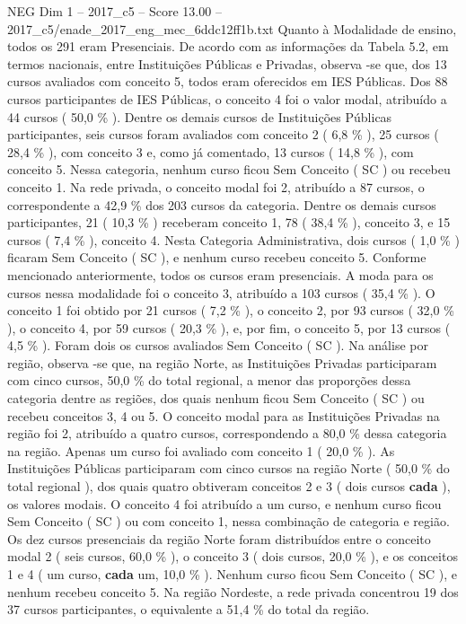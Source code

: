 \begin{textsample}{NEG Dim 1 – 2017\_c5 – Score 13.00 – 2017\_c5/enade\_2017\_eng\_mec\_6ddc12ff1b.txt}
Quanto à Modalidade de ensino, todos os 291 eram Presenciais.
De acordo com as informações da Tabela 5.2, em termos nacionais, entre Instituições Públicas e Privadas, observa -se que, dos 13 cursos avaliados com conceito 5, todos eram oferecidos em IES Públicas.
Dos 88 cursos participantes de IES Públicas, o conceito 4 foi o valor modal, atribuído a 44 cursos ( 50,0 \% ).
Dentre os demais cursos de Instituições Públicas participantes, seis cursos foram avaliados com conceito 2 ( 6,8 \% ), 25 cursos ( 28,4 \% ), com conceito 3 e, como já comentado, 13 cursos ( 14,8 \% ), com conceito 5.
Nessa categoria, nenhum curso ficou Sem Conceito ( SC ) ou recebeu conceito 1.
Na rede privada, o conceito modal foi 2, atribuído a 87 cursos, o correspondente a 42,9 \% dos 203 cursos da categoria.
Dentre os demais cursos participantes, 21 ( 10,3 \% ) receberam conceito 1, 78 ( 38,4 \% ), conceito 3, e 15 cursos ( 7,4 \% ), conceito 4.
Nesta Categoria Administrativa, dois cursos ( 1,0 \% ) ficaram Sem Conceito ( SC ), e nenhum curso recebeu conceito 5.
Conforme mencionado anteriormente, todos os cursos eram presenciais.
A moda para os cursos nessa modalidade foi o conceito 3, atribuído a 103 cursos ( 35,4 \% ).
O conceito 1 foi obtido por 21 cursos ( 7,2 \% ), o conceito 2, por 93 cursos ( 32,0 \% ), o conceito 4, por 59 cursos ( 20,3 \% ), e, por fim, o conceito 5, por 13 cursos ( 4,5 \% ).
Foram dois os cursos avaliados Sem Conceito ( SC ).
Na análise por região, observa -se que, na região Norte, as Instituições Privadas participaram com cinco cursos, 50,0 \% do total regional, a menor das proporções dessa categoria dentre as regiões, dos quais nenhum ficou Sem Conceito ( SC ) ou recebeu conceitos 3, 4 ou 5.
O conceito modal para as Instituições Privadas na região foi 2, atribuído a quatro cursos, correspondendo a 80,0 \% dessa categoria na região.
Apenas um curso foi avaliado com conceito 1 ( 20,0 \% ).
As Instituições Públicas participaram com cinco cursos na região Norte ( 50,0 \% do total regional ), dos quais quatro obtiveram conceitos 2 e 3 ( dois cursos \textbf{cada} ), os valores modais.
O conceito 4 foi atribuído a um curso, e nenhum curso ficou Sem Conceito ( SC ) ou com conceito 1, nessa combinação de categoria e região.
Os dez cursos presenciais da região Norte foram distribuídos entre o conceito modal 2 ( seis cursos, 60,0 \% ), o conceito 3 ( dois cursos, 20,0 \% ), e os conceitos 1 e 4 ( um curso, \textbf{cada} um, 10,0 \% ).
Nenhum curso ficou Sem Conceito ( SC ), e nenhum recebeu conceito 5.
Na região Nordeste, a rede privada concentrou 19 dos 37 cursos participantes, o equivalente a 51,4 \% do total da região.

\end{textsample}
